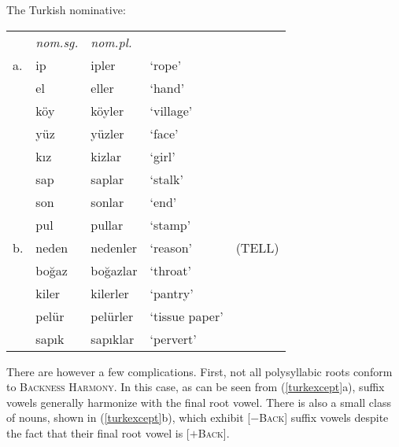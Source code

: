 \begin{example}
\label{turknom}
The Turkish nominative:

\vspace{0.5\baselineskip}
\begin{tabular}{l l l l l}
   & \emph{nom.sg.} & \emph{nom.pl.} \\
a. & ip             & ipler          & `rope' & \citep[][216]{Clements1982} \\
   & el             & eller          & `hand'    \\
   & köy            & köyler         & `village' \\
   & yüz            & yüzler         & `face'    \\
   & kız            & kizlar         & `girl'    \\
   & sap            & saplar         & `stalk'   \\
   & son            & sonlar         & `end'     \\
   & pul            & pullar         & `stamp'   \\
b. & neden          & nedenler       & `reason'  & (TELL) \\
   & boğaz          & boğazlar       & `throat'  \\
   & kiler          & kilerler       & `pantry'  \\
   & pelür          & pelürler       & `tissue paper' \\
   & sapık          & sapıklar       & `pervert' \\
\end{tabular}
\end{example}

There are however a few complications. First, not all polysyllabic roots conform to \textsc{Backness Harmony}. In this case, as can be seen from (\ref{turkexcept}a), suffix vowels generally harmonize with the final root vowel. 
There is also a small class of nouns, shown in (\ref{turkexcept}b), which exhibit [$-$\textsc{Back}] suffix vowels despite the fact that their final root vowel is [$+$\textsc{Back}].

